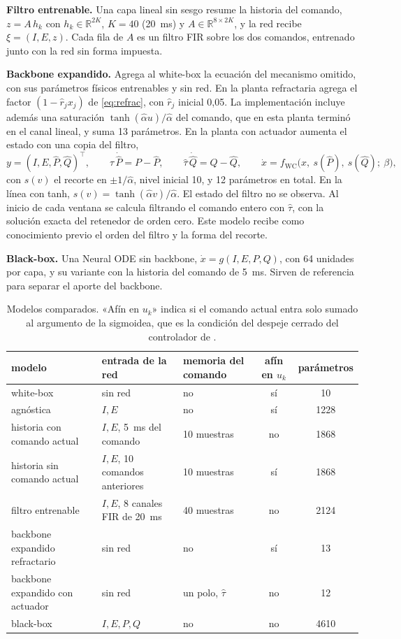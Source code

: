 \documentclass[11pt,a4paper]{article}
\newcommand{\fwc}{f_{\mathrm{WC}}}
\begin{document}
\textbf{Filtro entrenable.} Una capa lineal sin sesgo resume la historia del comando, $z = A\,h_k$ con $h_k \in \mathbb{R}^{2K}$, $K = 40$ (20~ms) y $A \in \mathbb{R}^{8\times 2K}$, y la red recibe $\xi = (I, E, z)$. Cada fila de $A$ es un filtro FIR sobre los dos comandos, entrenado junto con la red sin forma impuesta.

\textbf{Backbone expandido.} Agrega al white-box la ecuación del mecanismo omitido, con sus parámetros físicos entrenables y sin red. En la planta refractaria agrega el factor $(1 - \hat r_j x_j)$ de \eqref{eq:refrac}, con $\hat r_j$ inicial 0,05. La implementación incluye además una saturación $\tanh(\hat\alpha u)/\hat\alpha$ del comando, que en esta planta terminó en el canal lineal, y suma 13 parámetros. En la planta con actuador aumenta el estado con una copia del filtro,
\begin{equation}
y = (I, E, \hat P, \hat Q)^\top,\qquad \hat\tau\,\dot{\hat P} = P - \hat P,\qquad \hat\tau\,\dot{\hat Q} = Q - \hat Q,\qquad \dot x = \fwc\big(x,\ s(\hat P),\ s(\hat Q);\ \beta\big),
\label{eq:lag}
\end{equation}
con $s(v)$ el recorte en $\pm 1/\hat\alpha$, nivel inicial 10, y 12 parámetros en total. En la línea con tanh, $s(v) = \tanh(\hat\alpha v)/\hat\alpha$. El estado del filtro no se observa. Al inicio de cada ventana se calcula filtrando el comando entero con $\hat\tau$, con la solución exacta del retenedor de orden cero. Este modelo recibe como conocimiento previo el orden del filtro y la forma del recorte.

\textbf{Black-box.} Una Neural ODE sin backbone, $\dot x = g(I, E, P, Q)$, con 64 unidades por capa, y su variante con la historia del comando de 5~ms. Sirven de referencia para separar el aporte del backbone.

\begin{table}[H]
\centering
\footnotesize
\caption{Modelos comparados. «Afín en $u_k$» indica si el comando actual entra solo sumado al argumento de la sigmoidea, que es la condición del despeje cerrado del controlador de \cite{martinez2022ifac}.}
\label{tab:modelos}
\setlength{\tabcolsep}{4pt}
\begin{tabular}{@{}lllcc@{}}
\toprule
modelo & entrada de la red & memoria del comando & afín en $u_k$ & parámetros \\
\midrule
white-box & sin red & no & sí & 10 \\
agnóstica & $I, E$ & no & sí & 1228 \\
historia con comando actual & $I, E$, 5~ms del comando & 10 muestras & no & 1868 \\
historia sin comando actual & $I, E$, 10 comandos anteriores & 10 muestras & sí & 1868 \\
filtro entrenable & $I, E$, 8 canales FIR de 20~ms & 40 muestras & no & 2124 \\
backbone expandido refractario & sin red & no & sí & 13 \\
backbone expandido con actuador & sin red & un polo, $\hat\tau$ & no & 12 \\
black-box & $I, E, P, Q$ & no & no & 4610 \\
\bottomrule
\end{tabular}
\end{table}
\end{document}
